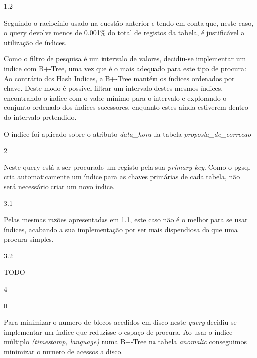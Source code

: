 \documentclass[12pt]{report}
\begin{document}
    
    \par 1.2%
    \par Seguindo o raciocínio usado na questão anterior e tendo em conta que, neste caso, o query devolve menos de 0.001\% do total de registos da tabela, é justificável a utilização de índices.
    
    \par Como o filtro de pesquisa é um intervalo de valores, decidiu-se implementar um indice com B+-Tree, uma vez que é o mais adequado para este tipo de procura: Ao contrário dos Hash Indices, a B+-Tree mantém os índices ordenados por chave. Deste modo é possível filtrar um intervalo destes mesmos índices, encontrando o índice com o valor mínimo para o intervalo e explorando o conjunto ordenado dos índices sucessores, enquanto estes ainda estiverem dentro do intervalo pretendido.
    \par O índice foi aplicado sobre o atributo \textit{{data\_hora}} da tabela \textit{proposta\_de\_correcao}\\
    
    \par 2
    \par Neste query está a ser procurado um registo pela sua \textit{primary key}. Como o pgsql cria automaticamente um índice para as chaves primárias de cada tabela, não será necessário criar um novo índice.\\
    
    \par 3.1
    \par Pelas mesmas razões apresentadas em 1.1, este caso não é o melhor para se usar índices, acabando a sua implementação por ser mais dispendiosa do que uma procura simples.\\
    
    \par 3.2
    \par TODO \\
    
    
    \par 4
    \par 0
    
    \par Para minimizar o numero de blocos acedidos em disco neste \textit{query} decidiu-se implementar um índice que reduzisse o espaço de procura. Ao usar o índice múltiplo \textit{(timestamp, language)} numa B+-Tree na tabela \textit{anomalia} conseguimos minimizar o numero de acessos a disco.
    
\end{document}
